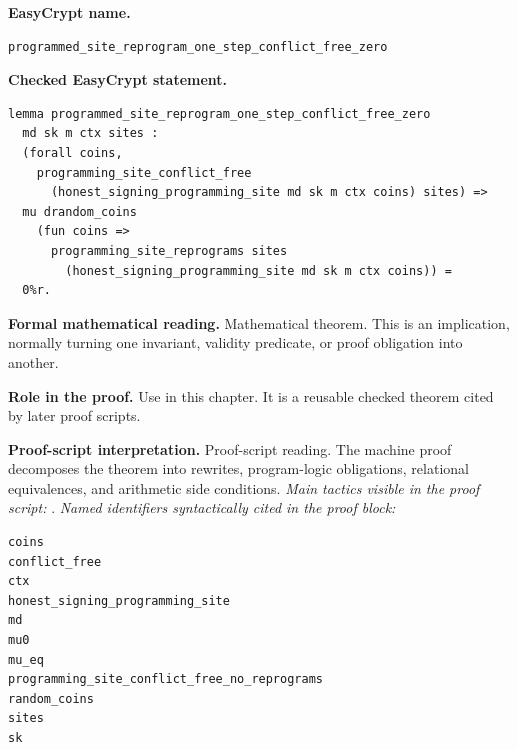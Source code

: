 \begin{formaltheorem}
\noindent\textbf{EasyCrypt name.}
\begin{lstlisting}[language=EasyCrypt,basicstyle=\ttfamily\scriptsize]
programmed_site_reprogram_one_step_conflict_free_zero
\end{lstlisting}
\noindent\textbf{Checked EasyCrypt statement.}
\begin{lstlisting}[language=EasyCrypt,basicstyle=\ttfamily\scriptsize]
lemma programmed_site_reprogram_one_step_conflict_free_zero
  md sk m ctx sites :
  (forall coins,
    programming_site_conflict_free
      (honest_signing_programming_site md sk m ctx coins) sites) =>
  mu drandom_coins
    (fun coins =>
      programming_site_reprograms sites
        (honest_signing_programming_site md sk m ctx coins)) =
  0%r.
\end{lstlisting}
\noindent\textbf{Formal mathematical reading.}
Mathematical theorem. This is an implication, normally turning one invariant, validity predicate, or proof obligation into another.

\noindent\textbf{Role in the proof.}
Use in this chapter. It is a reusable checked theorem cited by later proof scripts.

\noindent\textbf{Proof-script interpretation.}
Proof-script reading. The machine proof decomposes the theorem into rewrites, program-logic obligations, relational equivalences, and arithmetic side conditions.
\emph{Main tactics visible in the proof script:} .
\emph{Named identifiers syntactically cited in the proof block:}
\begin{lstlisting}[language=EasyCrypt,basicstyle=\ttfamily\scriptsize]
coins
conflict_free
ctx
honest_signing_programming_site
md
mu0
mu_eq
programming_site_conflict_free_no_reprograms
random_coins
sites
sk
\end{lstlisting}

\end{formaltheorem}

